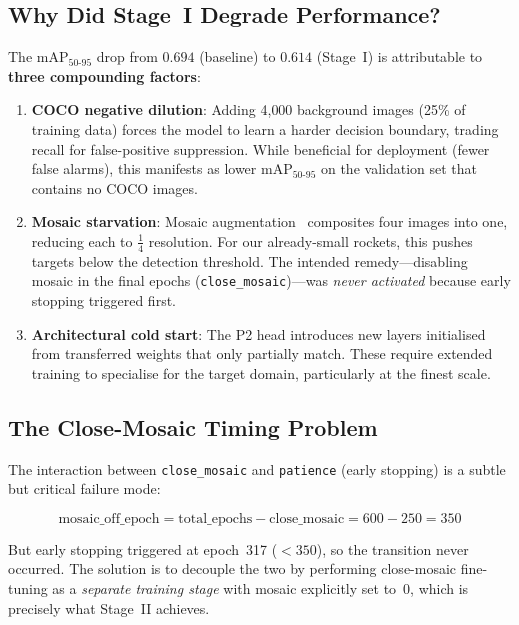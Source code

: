 \documentclass[11pt, a4paper]{article}
\newcommand{\mapfull}{\text{mAP}_{50\text{-}95}}
\begin{document}
\subsection{Why Did Stage~I Degrade Performance?}

The $\mapfull$ drop from $0.694$ (baseline) to $0.614$ (Stage~I) is
attributable to \textbf{three compounding factors}:

\begin{enumerate}[leftmargin=*]
  \item \textbf{COCO negative dilution}: Adding 4{,}000 background
        images (25\% of training data) forces the model to learn a
        harder decision boundary, trading recall for
        false-positive suppression.  While beneficial for deployment
        (fewer false alarms), this manifests as lower
        $\mapfull$ on the validation set that contains no COCO images.

  \item \textbf{Mosaic starvation}: Mosaic augmentation~\cite{bochkovskiy2020yolov4}
        composites four images into one,
        reducing each to $\frac{1}{4}$ resolution.  For our
        already-small rockets, this pushes targets below the
        detection threshold.  The intended remedy---disabling mosaic
        in the final epochs (\texttt{close\_mosaic})---was
        \emph{never activated} because early stopping triggered first.

  \item \textbf{Architectural cold start}: The P2 head introduces new
        layers initialised from transferred weights that only
        partially match.  These require extended training to specialise
        for the target domain, particularly at the finest scale.
\end{enumerate}

\subsection{The Close-Mosaic Timing Problem}
\label{sec:close_mosaic}

The interaction between \texttt{close\_mosaic} and \texttt{patience} (early
stopping) is a subtle but critical failure mode:

\[
  \text{mosaic\_off\_epoch} = \text{total\_epochs} - \text{close\_mosaic}
  = 600 - 250 = 350
\]

But early stopping triggered at epoch~317 ($<350$), so the transition never
occurred. The solution is to decouple the two by performing close-mosaic
fine-tuning as a \emph{separate training stage} with mosaic explicitly set
to~$0$, which is precisely what Stage~II achieves.
\end{document}
